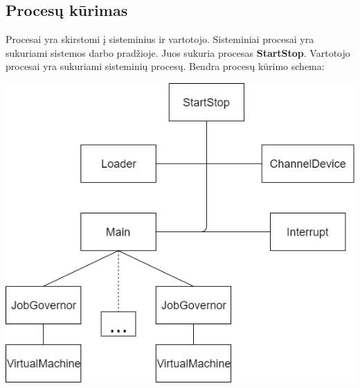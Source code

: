 \documentclass{scrartcl}
\begin{document}
      \subsection{Procesų kūrimas}
      Procesai yra skirstomi į sisteminius ir vartotojo. Sisteminiai procesai yra sukuriami sistemos darbo pradžioje. Juos sukuria procesas \textbf{StartStop}. Vartotojo procesai yra sukuriami sisteminių procesų. Bendra procesų kūrimo schema:
      \begin{center}
        \includegraphics[scale=0.5]{Process_creation}
      \end{center}
\end{document}
